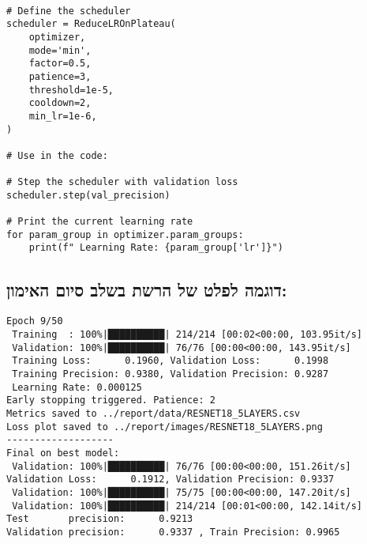 \newcommand{\vertline}{\textbar} %
\newcommand{\cornerline}{\rule{1.5ex}{0.4pt}} %
\newcommand{\branch}{\textbar\cornerline} %




\EN
\begin{tcolorbox}[colframe=black, colback=gray!5, boxrule=0.5mm, sharp corners]

\begin{verbatim}

# Define the scheduler
scheduler = ReduceLROnPlateau(
    optimizer,
    mode='min',
    factor=0.5,
    patience=3,
    threshold=1e-5,
    cooldown=2,
    min_lr=1e-6,
)

# Use in the code:

# Step the scheduler with validation loss
scheduler.step(val_precision)

# Print the current learning rate
for param_group in optimizer.param_groups:
    print(f" Learning Rate: {param_group['lr']}")
\end{verbatim}
\end{tcolorbox}
\HE 
\subsection*{דוגמה לפלט של הרשת בשלב סיום האימון:}
\EN
\begin{tcolorbox}[colframe=black, colback=gray!5, boxrule=0.5mm, sharp corners]
\begin{verbatim}
Epoch 9/50
 Training  : 100%|██████████| 214/214 [00:02<00:00, 103.95it/s]
 Validation: 100%|██████████| 76/76 [00:00<00:00, 143.95it/s]
 Training Loss:      0.1960, Validation Loss:      0.1998
 Training Precision: 0.9380, Validation Precision: 0.9287
 Learning Rate: 0.000125
Early stopping triggered. Patience: 2
Metrics saved to ../report/data/RESNET18_5LAYERS.csv
Loss plot saved to ../report/images/RESNET18_5LAYERS.png
-------------------
Final on best model:
 Validation: 100%|██████████| 76/76 [00:00<00:00, 151.26it/s]
Validation Loss:      0.1912, Validation Precision: 0.9337
 Validation: 100%|██████████| 75/75 [00:00<00:00, 147.20it/s]
 Validation: 100%|██████████| 214/214 [00:01<00:00, 142.14it/s]
Test       precision:      0.9213
Validation precision:      0.9337 , Train Precision: 0.9965

\end{verbatim}
\end{tcolorbox}

